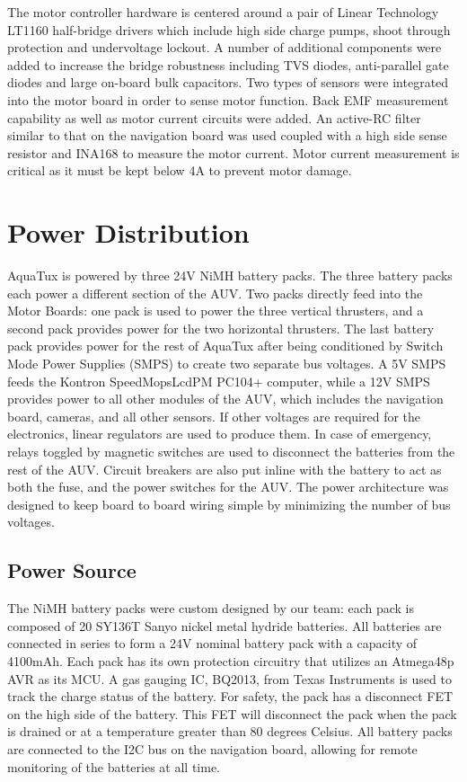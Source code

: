 The motor controller hardware is centered around a pair of Linear
Technology LT1160 half-bridge drivers which include high side charge
pumps, shoot through protection and undervoltage lockout. A number of
additional components were added to increase the bridge robustness
including TVS diodes, anti-parallel gate diodes and large on-board
bulk capacitors. Two types of sensors were integrated into the motor
board in order to sense motor function. Back EMF measurement
capability as well as motor current circuits were added. An active-RC
filter similar to that on the navigation board was used coupled with a
high side sense resistor and INA168 to measure the motor current.
Motor current measurement is critical as it must be kept below 4A to
prevent motor damage.

\section{Power Distribution}
AquaTux is powered by three 24V NiMH battery packs.  The three battery
packs each power a different section of the AUV.  Two packs directly
feed into the Motor Boards: one pack is used to power the three
vertical thrusters, and a second pack provides power for the two
horizontal thrusters.  The last battery pack provides power for the
rest of AquaTux after being conditioned by Switch Mode Power Supplies
(SMPS) to create two separate bus voltages. A 5V SMPS feeds the
Kontron SpeedMopsLcdPM PC104+ computer, while a 12V SMPS provides power to
all other modules of the AUV, which includes the navigation board,
cameras, and all other sensors. If other voltages are required for the
electronics, linear regulators are used to produce them.  In case of
emergency, relays toggled by magnetic switches are used to disconnect
the batteries from the rest of the AUV. Circuit breakers are also put
inline with the battery to act as both the fuse, and the power
switches for the AUV. The power architecture was designed to keep
board to board wiring simple by minimizing the number of bus voltages.

\subsection{Power Source}
The NiMH battery packs were custom designed by our team: each pack is
composed of 20 SY136T Sanyo nickel metal hydride batteries.  All
batteries are connected in series to form a 24V nominal battery pack
with a capacity of 4100mAh.  Each pack has its own protection
circuitry that utilizes an Atmega48p AVR as its MCU.  A gas gauging IC, BQ2013,
from Texas Instruments is used to track the charge status of the
battery. %
For safety, the pack has a disconnect FET on the high side of the
battery.  This FET will disconnect the pack when the pack is drained
or at a temperature greater than 80 degrees Celsius. All battery packs
are connected to the I2C bus on the navigation board, allowing for
remote monitoring of the batteries at all time.
